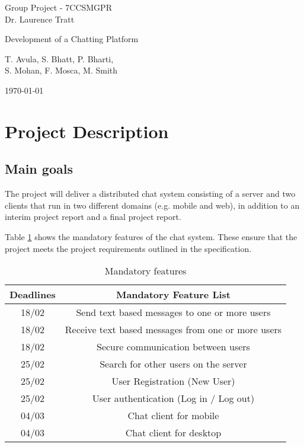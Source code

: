\documentclass[11pt,a4paper]{article}
\begin{document}
\begin{center}
\large{Group Project - 7CCSMGPR} \\
\large{Dr. Laurence Tratt}

\bigskip

\huge{Development of a Chatting Platform}

\bigskip

\Large{T. Avula, S. Bhatt, P. Bharti, \\S. Mohan, F. Mosca, M. Smith} \\

\bigskip

\large{\today}
\end{center}

\bigskip


\section{Project Description}
\subsection{Main goals}
The project will deliver a distributed chat system consisting of a server and two clients that run in two different domains (e.g. mobile and web), in addition to an interim project report and a final project report. 

Table \ref{Table: feat} shows the mandatory features of the chat system. These ensure that the project meets the project requirements outlined in the specification.

\begin {table}[H]
\begin{center}
\begin{tabular}{|c|c|}
\hline 
\rule[-1ex]{0pt}{2.5ex} \textbf{Deadlines} & \textbf{Mandatory Feature List} \\ 
\hline 
\rule[-1ex]{0pt}{2.5ex} 18/02 & Send text based messages to one or more users \\ 
\hline 
\rule[-1ex]{0pt}{2.5ex} 18/02 & Receive text based messages from one or more users \\ 
\hline 
\rule[-1ex]{0pt}{2.5ex} 18/02 & Secure communication between users \\ 
\hline 
\rule[-1ex]{0pt}{2.5ex} 25/02 & Search for other users on the server \\ 
\hline 
\rule[-1ex]{0pt}{2.5ex} 25/02 & User Registration (New User) \\ 
\hline 
\rule[-1ex]{0pt}{2.5ex} 25/02 & User authentication (Log in / Log out) \\ 
\hline 
\rule[-1ex]{0pt}{2.5ex} 04/03 & Chat client for mobile \\ 
\hline 
\rule[-1ex]{0pt}{2.5ex} 04/03 & Chat client for desktop \\ 
\hline 
\end{tabular} 
\caption{Mandatory features}\label{Table: feat}
\end{center}
\end {table}
\end{document}
